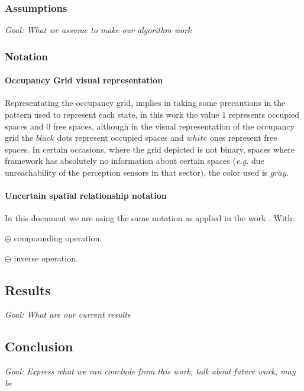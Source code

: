 \subsubsection*{Assumptions}

\textit{Goal: What we assume to make our algorithm work}

\subsubsection*{Notation}

\paragraph{Occupancy Grid visual representation}

Representating the occupancy grid, implies in taking some precautions in the pattern used to represent each state, in this work the value $1$ represents occupied spaces and $0$ free spaces, although in the visual representation of the occupancy grid the $black$ dots represent occupied spaces and $white$ ones represent free spaces. In certain occasions, where the grid depicted is not binary, spaces where framework has absolutely no information about certain spaces (\textit{e.g.} due unreachability of the perception sensors in that sector), the color used is $gray$.

\paragraph{Uncertain spatial relationship notation} In this document we are using the same notation as applied in the work \cite{Wang04a}. With:

$\oplus$ compounding operation.

$\ominus$ inverse operation.

\subsection{Results}

\textit{Goal: What are our current results}

\subsection{Conclusion}

\textit{Goal: Express what we can conclude from this work, talk about future work, may be}